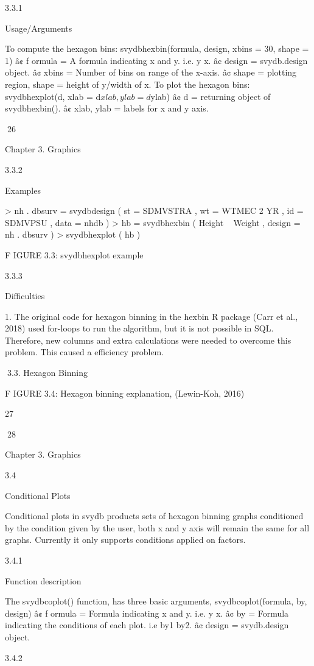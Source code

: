 3.3.1

Usage/Arguments

To compute the hexagon bins:
svydbhexbin(formula, design, xbins = 30, shape = 1)
â¢ f ormula = A formula indicating x and y. i.e. y x.
â¢ design = svydb.design object.
â¢ xbins = Number of bins on range of the x-axis.
â¢ shape = plotting region, shape = height of y/width of x.
To plot the hexagon bins:
svydbhexplot(d, xlab = d$xlab, ylab = d$ylab)
â¢ d = returning object of svydbhexbin().
â¢ xlab, ylab = labels for x and y axis.

26

Chapter 3. Graphics

3.3.2

Examples

> nh . dbsurv = svydbdesign ( st = SDMVSTRA , wt = WTMEC 2 YR ,
id = SDMVPSU , data = nhdb )
> hb = svydbhexbin ( Height ~ Weight , design = nh . dbsurv )
> svydbhexplot ( hb )

F IGURE 3.3: svydbhexplot example

3.3.3

Difficulties

1. The original code for hexagon binning in the hexbin R package (Carr et al.,
2018) used for-loops to run the algorithm, but it is not possible in SQL. Therefore, new columns and extra calculations were needed to overcome this problem. This caused a efficiency problem.

3.3. Hexagon Binning

F IGURE 3.4: Hexagon binning explanation, (Lewin-Koh, 2016)

27

28

Chapter 3. Graphics

3.4

Conditional Plots

Conditional plots in svydb products sets of hexagon binning graphs conditioned by
the condition given by the user, both x and y axis will remain the same for all graphs.
Currently it only supports conditions applied on factors.

3.4.1

Function description

The svydbcoplot() function, has three basic arguments,
svydbcoplot(formula, by, design)
â¢ f ormula = Formula indicating x and y. i.e. y x.
â¢ by = Formula indicating the conditions of each plot. i.e by1 by2.
â¢ design = svydb.design object.

3.4.2

